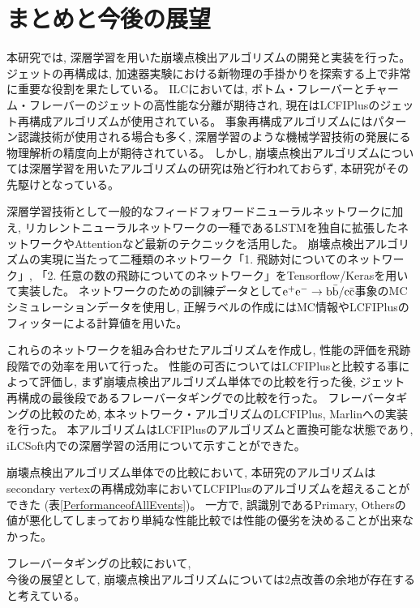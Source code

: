 
\chapter{まとめと今後の展望} \label{chap:Conclusion}

本研究では, 深層学習を用いた崩壊点検出アルゴリズムの開発と実装を行った。
ジェットの再構成は, 加速器実験における新物理の手掛かりを探索する上で非常に重要な役割を果たしている。
ILCにおいては, ボトム・フレーバーとチャーム・フレーバーのジェットの高性能な分離が期待され, 現在はLCFIPlusのジェット再構成アルゴリズムが使用されている。
事象再構成アルゴリズムにはパターン認識技術が使用される場合も多く, 深層学習のような機械学習技術の発展にる物理解析の精度向上が期待されている。
しかし, 崩壊点検出アルゴリズムについては深層学習を用いたアルゴリズムの研究は殆ど行われておらず, 本研究がその先駆けとなっている。

深層学習技術として一般的なフィードフォワードニューラルネットワークに加え, リカレントニューラルネットワークの一種であるLSTMを独自に拡張したネットワークやAttentionなど最新のテクニックを活用した。
崩壊点検出アルゴリズムの実現に当たって二種類のネットワーク「1. 飛跡対についてのネットワーク」, 「2. 任意の数の飛跡についてのネットワーク」をTensorflow/Kerasを用いて実装した。
ネットワークのための訓練データとして$\rm e^+e^- \to b \bar{b}/c \bar{c}$事象のMCシミュレーションデータを使用し, 正解ラベルの作成にはMC情報やLCFIPlusのフィッターによる計算値を用いた。

これらのネットワークを組み合わせたアルゴリズムを作成し, 性能の評価を飛跡段階での効率を用いて行った。
性能の可否についてはLCFIPlusと比較する事によって評価し, まず崩壊点検出アルゴリズム単体での比較を行った後, ジェット再構成の最後段であるフレーバータギングでの比較を行った。
フレーバータギングの比較のため, 本ネットワーク・アルゴリズムのLCFIPlus, Marlinへの実装を行った。
本アルゴリズムはLCFIPlusのアルゴリズムと置換可能な状態であり, iLCSoft内での深層学習の活用について示すことができた。

崩壊点検出アルゴリズム単体での比較において, 本研究のアルゴリズムはsecondary vertexの再構成効率においてLCFIPlusのアルゴリズムを超えることができた (表\ref{PerformanceofAllEvents})。
一方で, 誤識別であるPrimary, Othersの値が悪化してしまっており単純な性能比較では性能の優劣を決めることが出来なかった。

フレーバータギングの比較において, \\

今後の展望として, 崩壊点検出アルゴリズムについては$2$点改善の余地が存在すると考えている。

